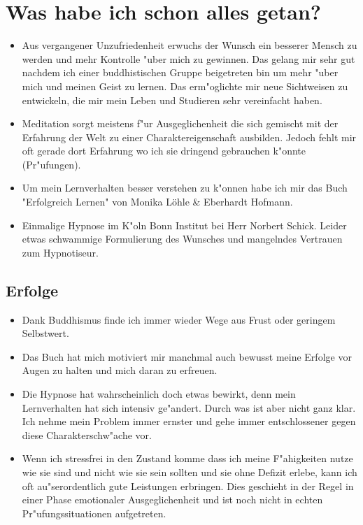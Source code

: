 \documentclass[11pt,a4paper,german]{article}
\begin{document}
\section{Was habe ich schon alles getan?}
\begin{itemize}
	\item Aus vergangener Unzufriedenheit erwuchs der Wunsch ein besserer Mensch zu werden und mehr Kontrolle "uber mich zu gewinnen. Das gelang mir sehr gut nachdem ich einer buddhistischen Gruppe beigetreten bin um mehr "uber mich und meinen Geist zu lernen. Das erm"oglichte mir neue Sichtweisen zu entwickeln, die mir mein Leben und Studieren sehr vereinfacht haben.
	\item Meditation sorgt meistens f"ur Ausgeglichenheit die sich gemischt mit der Erfahrung der Welt zu einer Charaktereigenschaft ausbilden. Jedoch fehlt mir oft gerade dort Erfahrung wo ich sie dringend gebrauchen k"onnte (Pr"ufungen).
	\item Um mein Lernverhalten besser verstehen zu k"onnen habe ich mir das Buch "{}Erfolgreich Lernen"{} von Monika Löhle \& Eberhardt Hofmann.
	\item Einmalige Hypnose im K"oln Bonn Institut bei Herr Norbert Schick. Leider etwas schwammige Formulierung des Wunsches und mangelndes Vertrauen zum Hypnotiseur.
\end{itemize}

\subsection{Erfolge}
	\begin{itemize}
		\item Dank Buddhismus finde ich immer wieder Wege aus Frust oder geringem Selbstwert.
		\item Das Buch hat mich motiviert mir manchmal auch bewusst meine Erfolge vor Augen zu halten und mich daran zu erfreuen. 
		\item Die Hypnose hat wahrscheinlich doch etwas bewirkt, denn mein Lernverhalten hat sich intensiv ge"andert. Durch was ist aber nicht ganz klar. Ich nehme mein Problem immer ernster und gehe immer entschlossener gegen diese Charakterschw"ache vor.
		\item Wenn ich stressfrei in den Zustand komme dass ich meine F"ahigkeiten nutze wie sie sind und nicht wie sie sein sollten und sie ohne Defizit erlebe, kann ich oft au"serordentlich gute Leistungen erbringen. Dies geschieht in der Regel in einer Phase emotionaler Ausgeglichenheit und ist noch nicht in echten Pr"ufungssituationen aufgetreten.
	\end{itemize}
\end{document}
